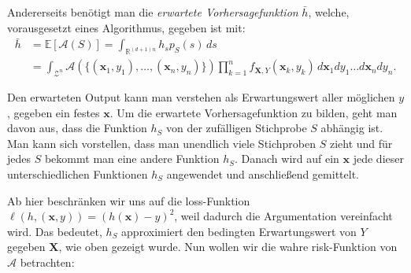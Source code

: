 Andererseits ben\"otigt man die \textit{erwartete Vorhersagefunktion} $\bar{h}$, welche, vorausgesetzt eines Algorithmus, gegeben ist mit:
\begin{equation*}
	\begin{split}
		\bar{h} & = \mathbb{E}[\mathcal{A}(S)] = \int_{\mathbb{R}^{(d+1)n}} h_s p_S(s)  \,ds  \\\
		& = \int_{\mathcal{Z}^n}\mathcal{A}(\{ (\mathbf{x}_1, y_1), \dots ,(\mathbf{x}_n, y_n)\}) \prod_{k=1}^n f_{\mathbf{X},Y}(\mathbf{x}_k, y_k) \, d\mathbf{x}_1 dy_1 \dots d\mathbf{x}_n dy_n.
	\end{split}
\end{equation*}


Den erwarteten Output kann man verstehen als Erwartungswert aller m\"oglichen $y$, gegeben ein festes $\mathbf{x}$.
Um die erwartete Vorhersagefunktion zu bilden, geht man davon aus, dass
die Funktion $h_S$ von der zuf\"alligen Stichprobe $S$ abh\"angig ist. Man kann sich vorstellen, dass man unendlich viele Stichproben $S$ zieht und
f\"ur jedes $S$ bekommt man eine andere Funktion $h_S$. Danach wird auf ein $\mathbf{x}$ jede dieser unterschiedlichen Funktionen $h_S$ angewendet und
anschlie{\ss}end gemittelt.


Ab hier beschr\"anken wir uns auf die loss-Funktion $ \ell(h, (\mathbf{x},y)) = (h(\mathbf{x}) - y)^2 $, weil dadurch die Argumentation vereinfacht wird.
Das bedeutet, $h_S$ approximiert den bedingten Erwartungswert von
$Y$ gegeben $\mathbf{X}$, wie oben gezeigt wurde. Nun wollen wir die wahre risk-Funktion von $\mathcal{A}$ betrachten:

